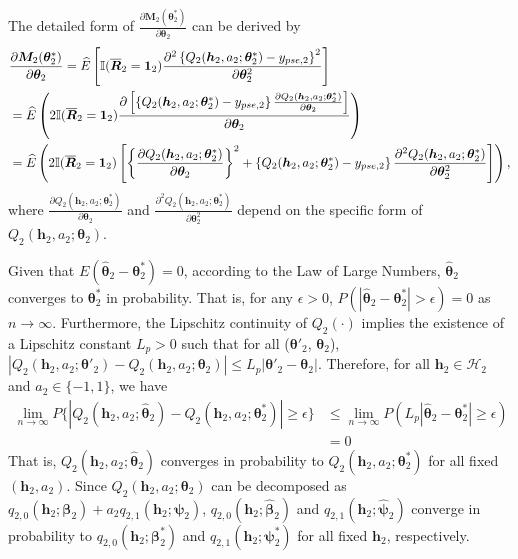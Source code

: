 \documentclass[12pt]{article}
\begin{document}
The detailed form of $\frac{\partial \bm{M}_2(\bm{\theta}_2^*)}{\partial \bm{\theta}_2}$ can be derived by
\begin{align}
    &\frac{\partial \bm{M}_2(\bm{\theta}_2^*)}{\partial \bm{\theta}_2} = \widehat{E}\left[ \mathbb{I}(\overline{\bm{R}}_{2}=\bm{1}_2) \frac{\partial^2 \left\{Q_2(\bm{h}_2,a_2;\bm{\theta}_2^*) - y_{pse,2}\right\} ^2}{\partial \bm{\theta}_2^2} \right] \notag \\
  &= \widehat{E}\left( 2 \mathbb{I} (\overline{\bm{R}}_{2}=\bm{1}_2)  \frac{\partial \left[ \left\{  
  Q_2(\bm{h}_2,a_2;\bm{\theta}_2^*) - y_{pse,2}\right\} \frac{\partial Q_2(\bm{h}_2,a_2;\bm{\theta}_2^*)}{\partial \bm{\theta}_2} \right]}{\partial \bm{\theta}_2} \right) \notag \\
  &= \widehat{E}\left( 2 \mathbb{I} (\overline{\bm{R}}_{2}=\bm{1}_2) \left[ \left\{ \frac{\partial Q_2(\bm{h}_2,a_2;\bm{\theta}_2^*)}{\partial \bm{\theta}_2} \right\}^2  +  \left\{  
  Q_2(\bm{h}_2,a_2;\bm{\theta}_2^*) - y_{pse,2}\right\} \frac{\partial^2 Q_2(\bm{h}_2,a_2;\bm{\theta}_2^*)}{\partial \bm{\theta}_2^2}   \right] \right), \label{eq1}
\end{align}
where $\frac{\partial Q_2(\bm{h}_2,a_2;\bm{\theta}_2^*)}{\partial \bm{\theta}_2}$ and $ \frac{\partial^2 Q_2(\bm{h}_2,a_2;\bm{\theta}_2^*)}{\partial \bm{\theta}_2^2}$ depend on the specific form of $Q_2(\bm{h}_2,a_2;\bm{\theta}_2)$.



Given that $E(\widehat{\bm{\theta}}_2 - \bm{\theta}_2^*) = 0$, according to the Law of Large Numbers, $\widehat{\bm{\theta}}_2$ converges to $\bm{\theta}_2^*$ in probability. That is, for any $\epsilon > 0$, $P(|\widehat{\bm{\theta}}_2 - \bm{\theta}_2^*| > \epsilon) = 0$ as $n \to \infty$. Furthermore, the Lipschitz continuity of $Q_2(\cdot)$ implies the existence of a Lipschitz constant $L_p > 0$ such that for all ($\bm{\theta}'_2$, $\bm{\theta}_2$), $|Q_2(\bm{h}_2, a_2; \bm{\theta}'_2) - Q_2(\bm{h}_2, a_2; \bm{\theta}_2)| \leq L_p |\bm{\theta}'_2 - \bm{\theta}_2 |$. Therefore, for all $\bm{h}_2 \in \mathcal{H}_2$ and $a_2 \in \{-1, 1\}$, we have
\begin{align*}
    \lim\limits_{n\to\infty}P\{|Q_2(\bm{h}_2,a_2;\widehat{\bm{\theta}}_2) - Q_2(\bm{h}_2,a_2;\bm{\theta}_2^*)|\geq \epsilon\} &\leq  \lim\limits_{n\to\infty} P( L_p |\widehat{\bm{\theta}}_2-\bm{\theta}_2^* | \geq \epsilon)\\
    & =0
\end{align*}
That is, $Q_2(\bm{h}_2,a_2;\widehat{\bm{\theta}}_2)$ converges in probability to $Q_2(\bm{h}_2,a_2;\bm{\theta}_2^*)$ for all fixed $(\bm{h}_2,a_2)$. Since $Q_2(\bm{h}_2,a_2;\bm{\theta}_2)$ can be decomposed as $q_{2,0}(\bm{h}_2; \bm{\beta}_2) + a_2 q_{2,1}(\bm{h}_2;\bm{\psi}_2)$, $q_{2,0}(\bm{h}_2; \widehat{\bm{\beta}}_2)$ and $q_{2,1}(\bm{h}_2;\widehat{\bm{\psi}}_2)$ converge in probability to $q_{2,0}(\bm{h}_2; \bm{\beta}_2^*)$ and $q_{2,1}(\bm{h}_2;\bm{\psi}_2^*)$ for all fixed $\bm{h}_2$, respectively.
\end{document}

